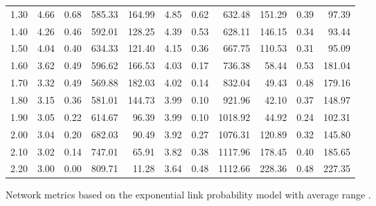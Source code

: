 \documentclass{article}
\begin{document}
\begin{figure}[h]
\begin{center}
\begin{tabular}{|r|rr|rr|rr|rr|rr|}
1.30 & 4.66 & 0.68 & 585.33 & 164.99 & 4.85 & 0.62 &  632.48 & 151.29 & 0.39 & 97.39\\
1.40 & 4.26 & 0.46 & 592.01 & 128.25 & 4.39 & 0.53 &  628.11 & 146.15 & 0.34 & 93.44\\
1.50 & 4.04 & 0.40 & 634.33 & 121.40 & 4.15 & 0.36 &  667.75 & 110.53 & 0.31 & 95.09\\
1.60 & 3.62 & 0.49 & 596.62 & 166.53 & 4.03 & 0.17 &  736.38 &  58.44 & 0.53 & 181.04\\
1.70 & 3.32 & 0.49 & 569.88 & 182.03 & 4.02 & 0.14 &  832.04 &  49.43 & 0.48 & 179.16\\
1.80 & 3.15 & 0.36 & 581.01 & 144.73 & 3.99 & 0.10 &  921.96 &  42.10 & 0.37 & 148.97\\
1.90 & 3.05 & 0.22 & 614.67 &  96.39 & 3.99 & 0.10 & 1018.92 &  44.92 & 0.24 & 102.31\\
2.00 & 3.04 & 0.20 & 682.03 &  90.49 & 3.92 & 0.27 & 1076.31 & 120.89 & 0.32 & 145.80\\
2.10 & 3.02 & 0.14 & 747.01 &  65.91 & 3.82 & 0.38 & 1117.96 & 178.45 & 0.40 & 185.65\\
2.20 & 3.00 & 0.00 & 809.71 &  11.28 & 3.64 & 0.48 & 1112.66 & 228.36 & 0.48 & 227.35\\
\hline
\end{tabular}
\caption{Network metrics based on the exponential link probability model with average range .}
\label{exp_exp}
\end{center}
\end{figure}
\end{document}
